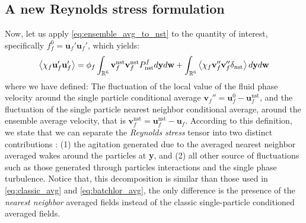 \subsection{A new Reynolds stress formulation}

Now, let us apply \ref{eq:ensemble_avg_to_nst} to the quantity of interest, specifically $f_f^0 = \textbf{u}_f'\textbf{u}_f'$, which yields: 
\begin{equation}
    \avg{\chi_f \textbf{u}_f'\textbf{u}_f'}
    = 
    \phi_f
    \int_{\mathbb{R}^6}
    \textbf{v}_f^\text{nst}
    \textbf{v}_f^\text{nst}
    P_\text{nst}^f
    d\textbf{y}
    d\textbf{w}
    + 
    \int_{\mathbb{R}^6}
    \avg{
        \chi_f
        \textbf{v}_f''
        \textbf{v}_f''
        \delta_\text{nst}
    }
    d\textbf{y}
    d\textbf{w}
    \label{eq:relation_ensemble_nst}
\end{equation}
where we have defined: 
The fluctuation of the local value of the fluid phase velocity around the single particle conditional average $\textbf{v}_f'' = \textbf{u}_f^0 - \textbf{u}_f^\text{nst}$, and the fluctuation of the single particle nearest neighbor conditional average, around the ensemble average velocity, that is $\textbf{v}_f^\text{nst} = \textbf{u}_f^\text{nst} - \textbf{u}_f$. 
According to this definition, 
we state that we can separate the \textit{Reynolds stress} tensor into two distinct contributions :  (1) the agitation generated due to the averaged nearest neighbor averaged wakes around the particles at \textbf{y}, and (2) all other source of fluctuations such as those generated through particles interactions and the single phase turbulence. 
Notice that, this decomposition is similar than those used in \ref{eq:classic_avg} and \ref{eq:batchlor_avg}, the only difference is the presence of the \textit{nearest neighbor} averaged fields instead of the classic single-particle conditioned averaged fields. 

